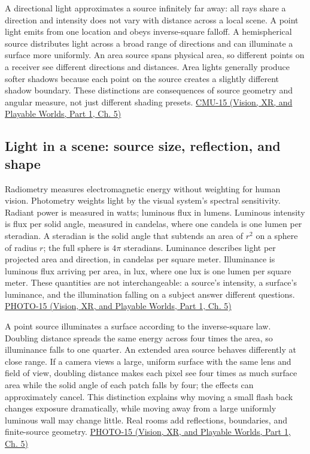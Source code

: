 A directional light approximates a source infinitely far away: all rays share a direction and intensity does not vary with distance across a local scene. A point light emits from one location and obeys inverse-square falloff. A hemispherical source distributes light across a broad range of directions and can illuminate a surface more uniformly. An area source spans physical area, so different points on a receiver see different directions and distances. Area lights generally produce softer shadows because each point on the source creates a slightly different shadow boundary. These distinctions are consequences of source geometry and angular measure, not just different shading presets. \href{../07-Vision-XR-and-Playable-Worlds-P01/main.pdf\#nameddest=04-visual-computing-ii-ch036-cmu-15---radiometry}{CMU-15 (Vision, XR, and Playable Worlds, Part 1, Ch. 5)}

\subsection{Light in a scene: source size, reflection, and shape}\label{03-visual-computing-i-ch004-light-in-a-scene-source-size-reflection-and-shape}

\hypertarget{03-visual-computing-i-ch004-light-in-a-scene-source-size-reflection-and-shape}{}

Radiometry measures electromagnetic energy without weighting for human vision. Photometry weights light by the visual system's spectral sensitivity. Radiant power is measured in watts; luminous flux in lumens. Luminous intensity is flux per solid angle, measured in candelas, where one candela is one lumen per steradian. A steradian is the solid angle that subtends an area of \(r^2\) on a sphere of radius \(r\); the full sphere is \(4\pi\) steradians. Luminance describes light per projected area and direction, in candelas per square meter. Illuminance is luminous flux arriving per area, in lux, where one lux is one lumen per square meter. These quantities are not interchangeable: a source's intensity, a surface's luminance, and the illumination falling on a subject answer different questions. \href{../07-Vision-XR-and-Playable-Worlds-P01/main.pdf\#nameddest=04-visual-computing-ii-ch036-photo-15---photography-session-15}{PHOTO-15 (Vision, XR, and Playable Worlds, Part 1, Ch. 5)}

A point source illuminates a surface according to the inverse-square law. Doubling distance spreads the same energy across four times the area, so illuminance falls to one quarter. An extended area source behaves differently at close range. If a camera views a large, uniform surface with the same lens and field of view, doubling distance makes each pixel see four times as much surface area while the solid angle of each patch falls by four; the effects can approximately cancel. This distinction explains why moving a small flash back changes exposure dramatically, while moving away from a large uniformly luminous wall may change little. Real rooms add reflections, boundaries, and finite-source geometry. \href{../07-Vision-XR-and-Playable-Worlds-P01/main.pdf\#nameddest=04-visual-computing-ii-ch036-photo-15---photography-session-15}{PHOTO-15 (Vision, XR, and Playable Worlds, Part 1, Ch. 5)}


